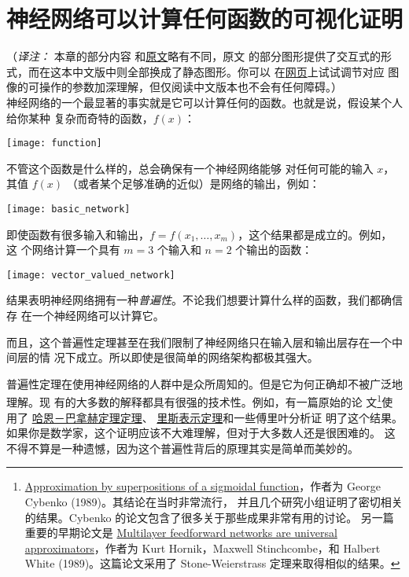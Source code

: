 
\chapter{神经网络可以计算任何函数的可视化证明}
\label{ch:VisualProof}

（\emph{译注：} 本章的部分内容
和\href{http://neuralnetworksanddeeplearning.com/chap4.html}{原文}略有不同，原文
的部分图形提供了交互式的形式，而在这本中文版中则全部换成了静态图形。你可以
在\href{http://neuralnetworksanddeeplearning.com/chap4.html}{网页}上试试调节对应
图像的可操作的参数加深理解，但仅阅读中文版本也不会有任何障碍。）\\

神经网络的一个最显著的事实就是它可以计算任何的函数。也就是说，假设某个人给你某种
复杂而奇特的函数，$f(x)$：
\begin{center}
  \texttt{[image: function]}
\end{center}

\label{basic_network_precursor}不管这个函数是什么样的，总会确保有一个神经网络能够
对任何可能的输入 $x$，其值 $f(x)$ （或者某个足够准确的近似）是网络的输出，例如：
\begin{center}
  \texttt{[image: basic\_network]}
\end{center}

即使函数有很多输入和输出，$f = f(x_1, \ldots, x_m)$，这个结果都是成立的。例如，这
个网络计算一个具有 $m = 3$ 个输入和 $n = 2$ 个输出的函数：
\begin{center}
  \texttt{[image: vector\_valued\_network]}
\end{center}

结果表明神经网络拥有一种\emph{普遍性}。不论我们想要计算什么样的函数，我们都确信存
在一个神经网络可以计算它。

而且，这个普遍性定理甚至在我们限制了神经网络只在输入层和输出层存在一个中间层的情
况下成立。所以即使是很简单的网络架构都极其强大。

普遍性定理在使用神经网络的人群中是众所周知的。但是它为何正确却不被广泛地理解。现
有的大多数的解释都具有很强的技术性。例如，有一篇原始的论
文\footnote{\href{http://www.dartmouth.edu/~gvc/Cybenko_MCSS.pdf}{Approximation
    by superpositions of a sigmoidal function}，作者为 George Cybenko (1989)。其结论在当时非常流行，
    并且几个研究小组证明了密切相关的结果。Cybenko 的论文包含了很多关于那些成果非常有用的讨论。    
    另一篇重要的早期论文是
    \href{http://www.sciencedirect.com/science/article/pii/0893608089900208}{Multilayer
    feedforward networks are universal approximators}，作者为 Kurt Hornik，Maxwell
  Stinchcombe，和 Halbert White (1989)。这篇论文采用了 Stone-Weierstrass
  定理来取得相似的结果。}使用了%
\href{https://zh.wikipedia.org/wiki/哈恩－巴拿赫定理}{哈恩－巴拿赫定理定理}、%
\href{https://zh.wikipedia.org/wiki/里斯表示定理}{里斯表示定理}和一些傅里叶分析证
明了这个结果。如果你是数学家，这个证明应该不大难理解，但对于大多数人还是很困难的。
这不得不算是一种遗憾，因为这个普遍性背后的原理其实是简单而美妙的。

